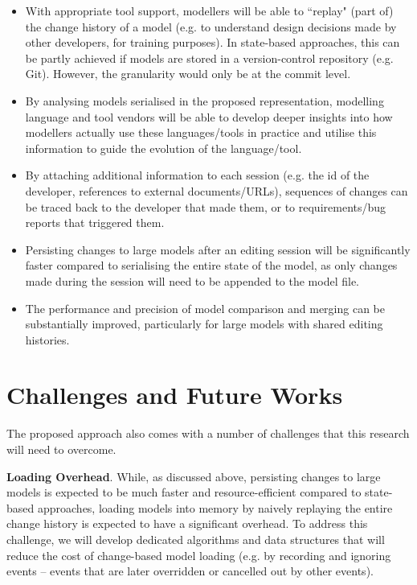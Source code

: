 \documentclass{llncs}
\begin{document}
\begin{itemize}
\item With appropriate tool support, modellers will be able to ``replay" (part of) the change history of a model (e.g. to understand design decisions made by other developers, for training purposes). In state-based approaches, this can be partly achieved if models are stored in a version-control repository (e.g. Git). However, the granularity would only be at the commit level.
\item By analysing models serialised in the proposed representation, modelling language and tool vendors will be able to develop deeper insights into how modellers actually use these languages/tools in practice and utilise this information to guide the evolution of the language/tool.
\item By attaching additional information to each session (e.g. the id of the developer, references to external documents/URLs), sequences of changes can be traced back to the developer that made them, or to requirements/bug reports that triggered them.
\item Persisting changes to large models after an editing session will be significantly faster compared to serialising the entire state of the model, as only changes made during the session will need to be appended to the model file.
\item The performance and precision of model comparison and merging can be substantially improved, particularly for large models with shared editing histories.
\end{itemize}

\section{Challenges and Future Works}
\label{Challenges and Future Works}
The proposed approach also comes with a number of challenges that this research will need to overcome.

\textbf{Loading Overhead}. While, as discussed above, persisting changes to large models is expected to be much faster and resource-efficient compared to state-based approaches, loading models into memory by naively replaying the entire change history is expected to have a significant overhead. To address this challenge, we will develop dedicated algorithms and data structures that will reduce the cost of change-based model loading (e.g. by recording and ignoring events -- events that are later overridden or cancelled out by other events). 
\end{document}
